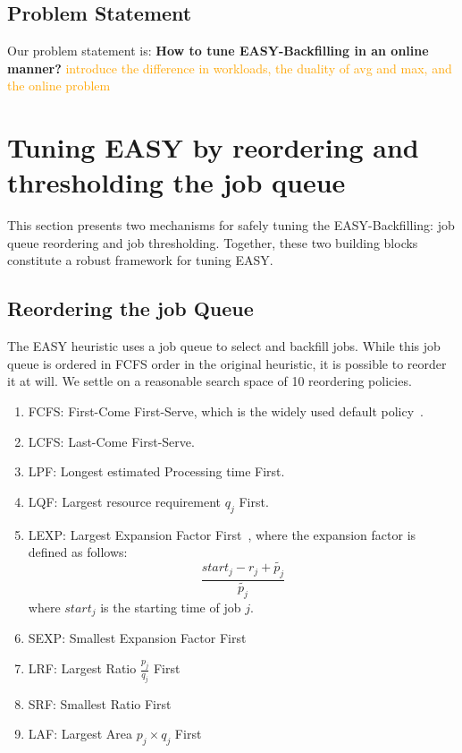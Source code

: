 \documentclass[sigconf]{acmart}
\begin{document}
\subsection{Problem Statement}

Our problem statement is: \textbf{How to tune EASY-Backfilling in an online manner?}
\textcolor{orange}{introduce the difference in workloads, the duality of avg and max, and the online problem}

\section{Tuning EASY by reordering and thresholding the job queue}
\label{sec:framework}

This section presents two mechanisms for safely tuning the EASY-Backfilling:
job queue reordering and job thresholding. Together, these two building blocks
constitute a robust framework for tuning EASY.

\subsection{Reordering the job Queue}
\label{subsec:policies}

The EASY heuristic uses a job queue to select and backfill jobs. While this job
queue is ordered in FCFS order in the original heuristic, it is possible to
reorder it at will. We settle on a reasonable search space of 10 reordering policies.

\begin{enumerate}
  \item FCFS: First-Come First-Serve, which is the widely used default policy~\cite{easy}.
  \item LCFS: Last-Come First-Serve.
  \item LPF: Longest estimated Processing time First.
  \item LQF: Largest resource requirement $q_j$ First.
  \item LEXP: Largest Expansion Factor First~\cite{bfchar}, where the expansion
    factor is defined as follows:
  \begin{equation} \frac{start_j - r_j + \widetilde{p_j}}{\widetilde{p_j}} \end{equation}
  where $start_j$ is the starting time of job $j$.
  \item SEXP: Smallest Expansion Factor First
  \item LRF: Largest Ratio $\frac{p_j}{q_j}$ First
  \item SRF: Smallest Ratio First
  \item LAF: Largest Area $ p_j \times q_j$ First
\end{enumerate}
\end{document}
